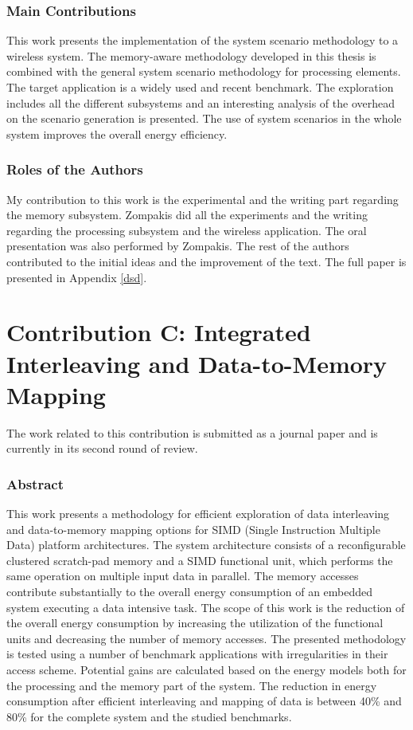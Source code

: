 \subsubsection{Main Contributions}

This work presents the implementation of the system scenario methodology to a wireless system.
The memory-aware methodology developed in this thesis is combined with the general system scenario methodology for processing elements.
The target application is a widely used and recent benchmark.
The exploration includes all the different subsystems and an interesting analysis of the overhead on the scenario generation is presented.
The use of system scenarios in the whole system improves the overall energy efficiency.

\subsubsection{Roles of the Authors}

My contribution to this work is the experimental and the writing part regarding the memory subsystem.
Zompakis did all the experiments and the writing regarding the processing subsystem and the wireless application.
The oral presentation was also performed by Zompakis.
The rest of the authors contributed to the initial ideas and the improvement of the text.
The full paper is presented in Appendix \ref{dsd}.

\section{Contribution C: Integrated Interleaving and Data-to-Memory Mapping}

The work related to this contribution is submitted as a journal paper and is currently in its second round of review.

\subsubsection{Abstract}

This work presents a methodology for efficient exploration of data interleaving and data-to-memory mapping options for SIMD (Single Instruction Multiple Data) platform architectures.
The system architecture consists of  a reconfigurable clustered scratch-pad memory and a SIMD functional unit, which performs the same operation on multiple input data in parallel. 
The memory accesses contribute substantially to the overall energy consumption of an embedded system executing a data intensive task. 
The scope of this work is the reduction of the overall energy consumption by increasing the utilization of the functional units and decreasing the number of memory accesses.
The presented methodology is tested using a number of benchmark applications with irregularities in their access scheme.
Potential gains are calculated based on the energy models both for the processing and the memory part of the system.
The reduction in energy consumption after efficient interleaving and mapping of data is between 40\% and 80\% for the complete system and the studied benchmarks.

